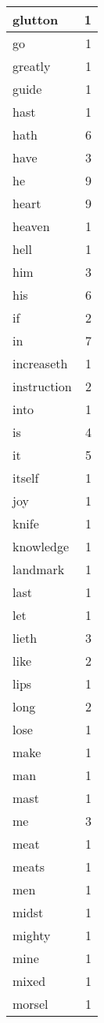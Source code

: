 \begin{center}
\begin{longtable}{l|r}
glutton & 1\\ \hline 
go & 1\\ \hline 
greatly & 1\\ \hline 
guide & 1\\ \hline 
hast & 1\\ \hline 
hath & 6\\ \hline 
have & 3\\ \hline 
he & 9\\ \hline 
heart & 9\\ \hline 
heaven & 1\\ \hline 
hell & 1\\ \hline 
him & 3\\ \hline 
his & 6\\ \hline 
if & 2\\ \hline 
in & 7\\ \hline 
increaseth & 1\\ \hline 
instruction & 2\\ \hline 
into & 1\\ \hline 
is & 4\\ \hline 
it & 5\\ \hline 
itself & 1\\ \hline 
joy & 1\\ \hline 
knife & 1\\ \hline 
knowledge & 1\\ \hline 
landmark & 1\\ \hline 
last & 1\\ \hline 
let & 1\\ \hline 
lieth & 3\\ \hline 
like & 2\\ \hline 
lips & 1\\ \hline 
long & 2\\ \hline 
lose & 1\\ \hline 
make & 1\\ \hline 
man & 1\\ \hline 
mast & 1\\ \hline 
me & 3\\ \hline 
meat & 1\\ \hline 
meats & 1\\ \hline 
men & 1\\ \hline 
midst & 1\\ \hline 
mighty & 1\\ \hline 
mine & 1\\ \hline 
mixed & 1\\ \hline 
morsel & 1\\ \hline 

\end{longtable}
\end{center}
